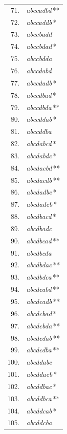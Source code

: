 \begin{center}
\begin{minipage}[t]{.31\linewidth}
\begin{tabular}{r@{\ }l}
\end{tabular}\end{minipage}\hfill%
\begin{minipage}[t]{.31\linewidth}\centering
\begin{tabular}{r@{\ }l}
71. & \emph{abccadbd}\,** \\
72. & \emph{abccaddb}\,* \\
73. & \emph{abccbadd} \\
74. & \emph{abccbdad}\,* \\
75. & \emph{abccbdda} \\
76. & \emph{abccdabd} \\
77. & \emph{abccdadb}\,* \\
78. & \emph{abccdbad}\,* \\
79. & \emph{abccdbda}\,** \\
80. & \emph{abccddab}\,* \\
81. & \emph{abccddba} \\
82. & \emph{abcdabcd}\,* \\
83. & \emph{abcdabdc}\,* \\
84. & \emph{abcdacbd}\,** \\
85. & \emph{abcdacdb}\,** \\
86. & \emph{abcdadbc}\,* \\
87. & \emph{abcdadcb}\,* \\
88. & \emph{abcdbacd}\,* \\
89. & \emph{abcdbadc} \\
90. & \emph{abcdbcad}\,** \\
91. & \emph{abcdbcda} \\
92. & \emph{abcdbdac}\,** \\
93. & \emph{abcdbdca}\,** \\
94. & \emph{abcdcabd}\,** \\
95. & \emph{abcdcadb}\,** \\
96. & \emph{abcdcbad}\,* \\
97. & \emph{abcdcbda}\,** \\
98. & \emph{abcdcdab}\,** \\
99. & \emph{abcdcdba}\,** \\
100. & \emph{abcddabc} \\
101. & \emph{abcddacb}\,* \\
102. & \emph{abcddbac}\,* \\
103. & \emph{abcddbca}\,** \\
104. & \emph{abcddcab}\,* \\
105. & \emph{abcddcba} \\
\end{tabular}\end{minipage}
\end{center}
